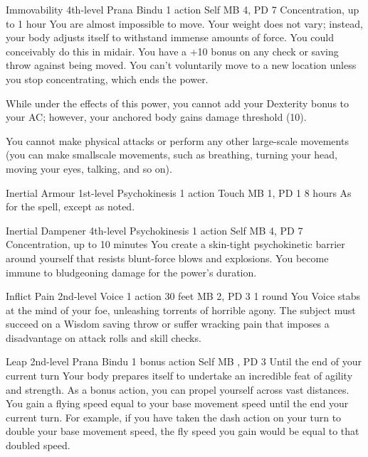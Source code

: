 \DndPowerHeader%
  {Immovability}
  {4th-level Prana Bindu}
  {1 action}
  {Self}
  {MB 4, PD 7}
  {Concentration, up to 1 hour}
  You are almost impossible to move.
  Your weight does not vary;
  instead, your body adjusts itself to withstand
  immense amounts of force.
  You could conceivably do this in midair.
  You have a +10 bonus on any check or saving throw
  against being moved.
  You can't voluntarily move to a new location
  unless you stop concentrating, which ends the power.

  While under the effects of this power,
  you cannot add your Dexterity bonus to your AC;
  however, your anchored body gains damage threshold (10).
  
  You cannot make physical attacks
  or perform any other large-scale movements
  (you can make smallscale movements,
  such as breathing,
  turning your head,
  moving your eyes,
  talking, and so on).

\DndPowerHeader%
  {Inertial Armour}
  {1st-level Psychokinesis}
  {1 action}
  {Touch}
  {MB 1, PD 1}
  {8 hours}
As for the  spell, except as noted.

\DndPowerHeader%
  {Inertial Dampener}
  {4th-level Psychokinesis}
  {1 action}
  {Self}
  {MB 4, PD 7}
  {Concentration, up to 10 minutes}
  You create a skin-tight psychokinetic barrier around yourself
  that resists blunt-force blows and explosions.
  You become immune to bludgeoning damage for the power's duration.

\DndPowerHeader%
  {Inflict Pain}
  {2nd-level Voice}
  {1 action}
  {30 feet}
  {MB 2, PD 3}
  {1 round}
  You Voice stabs at the mind of your foe,
  unleashing torrents of horrible agony.
  The subject must succeed on a Wisdom saving throw or
  suffer wracking pain that imposes a disadvantage on attack rolls
  and skill checks.

\DndPowerHeader%
  {Leap}
  {2nd-level Prana Bindu}
  {1 bonus action}
  {Self}
  {MB , PD 3}
  {Until the end of your current turn}
Your body prepares itself to undertake an incredible feat
of agility and strength.
As a bonus action,
you can propel yourself across vast distances.
You gain a flying speed equal to your base movement speed
until the end your current turn.
For example,
if you have taken the dash action on your turn to double
your base movement speed,
the fly speed you gain would be equal to that doubled speed.
 
